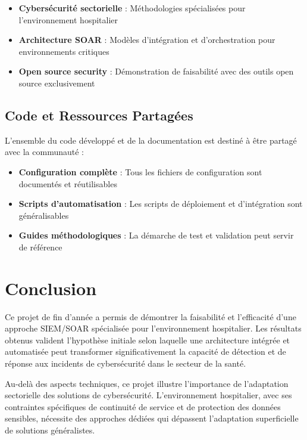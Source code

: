 \begin{itemize}
  \item \textbf{Cybersécurité sectorielle} : Méthodologies spécialisées pour l'environnement hospitalier
  \item \textbf{Architecture SOAR} : Modèles d'intégration et d'orchestration pour environnements critiques
  \item \textbf{Open source security} : Démonstration de faisabilité avec des outils open source exclusivement
\end{itemize}

\subsection{Code et Ressources Partagées}

L'ensemble du code développé et de la documentation est destiné à être partagé avec la communauté :

\begin{itemize}
  \item \textbf{Configuration complète} : Tous les fichiers de configuration sont documentés et réutilisables
  \item \textbf{Scripts d'automatisation} : Les scripts de déploiement et d'intégration sont généralisables
  \item \textbf{Guides méthodologiques} : La démarche de test et validation peut servir de référence
\end{itemize}

\section{Conclusion}

Ce projet de fin d'année a permis de démontrer la faisabilité et l'efficacité d'une approche SIEM/SOAR spécialisée pour l'environnement hospitalier. Les résultats obtenus valident l'hypothèse initiale selon laquelle une architecture intégrée et automatisée peut transformer significativement la capacité de détection et de réponse aux incidents de cybersécurité dans le secteur de la santé.

Au-delà des aspects techniques, ce projet illustre l'importance de l'adaptation sectorielle des solutions de cybersécurité. L'environnement hospitalier, avec ses contraintes spécifiques de continuité de service et de protection des données sensibles, nécessite des approches dédiées qui dépassent l'adaptation superficielle de solutions généralistes.

